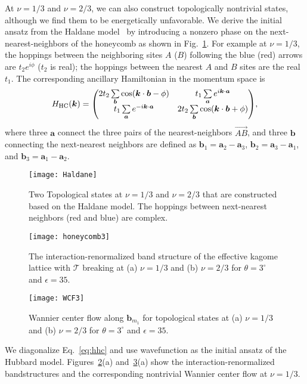\documentclass[aps,prl,floatfix,twocolumn]{revtex4-1}
\begin{document}
At $ \nu=1/3 $ and $ \nu=2/3 $, we can also construct topologically nontrivial states, although we find them to be energetically unfavorable. We derive the initial ansatz from the Haldane model~\cite{haldane1988model,raghu2008topological} by introducing a nonzero phase on the next-nearest-neighbors of the honeycomb as shown in Fig.~\ref{fig:haldane}. For example at $ \nu=1/3 $, the hoppings between the neighboring sites $ A $ ($ B $) following the blue (red) arrows are $ {t_2} e^{i\phi} $ ($ t_2 $ is real); the hoppings between the nearest $ A $ and $ B $ sites are the real $ t_1  $. The corresponding ancillary Hamiltonian in the momentum space is
\begin{equation}\label{eq:hhc}
	H_{\text{HC}}(\bm{k})=\mqty(2t_2 \sum\limits_{\bm{b}} \cos(\bm{k} \cdot \bm{b}-\phi) & t_1 \sum\limits_{\bm{a}} e^{i \bm{k}\cdot \bm{a}}\\
	t_1 \sum\limits_{\bm{a}} e^{-i \bm{k}\cdot \bm{a}}  & 2t_2 \sum\limits_{\bm{b}} \cos(\bm{k}\cdot \bm{b}+\phi)
	),
\end{equation}
where three $ \bm{a} $ connect the three pairs of the nearest-neighbors $ \overrightarrow{AB} $, and three $ \bm{b} $ connecting the next-nearest neighbors are defined as $ \bm{b}_1=\bm{a}_2-\bm{a}_3 $, $ \bm{b}_2=\bm{a}_3-\bm{a}_1 $, and $ \bm{b}_3=\bm{a}_1-\bm{a}_2 $. 
\begin{figure}[t]
	\centering
	\texttt{[image: Haldane]}
	\caption{Two Topological states at $ \nu=1/3 $ and $ \nu=2/3 $ that are constructed based on the Haldane model. The hoppings between next-nearest neighbors (red and blue) are complex.}
	\label{fig:haldane}
\end{figure}


\begin{figure}[t]
	\centering
	\texttt{[image: honeycomb3]}
	\caption{The interaction-renormalized band structure of the effective kagome lattice with $ \mathcal{T} $ breaking at (a) $ \nu=1/3 $ and (b) $ \nu=2/3 $ for $ \theta=3^\circ $ and $ \epsilon=35 $.}
	\label{fig:honeycomb3}
\end{figure}

\begin{figure}[t]
	\centering
	\texttt{[image: WCF3]}
	\caption{Wannier center flow along $ \bm{b}_{m_1} $ for topological states at (a) $ \nu=1/3 $ and (b) $ \nu=2/3 $ for $ \theta=3^\circ $ and $ \epsilon=35 $.}
	\label{fig:WCF3}
\end{figure}
We diagonalize Eq.~\eqref{eq:hhc} and use wavefunction as the initial ansatz of the Hubbard model. Figures~\ref{fig:honeycomb3}(a) and~\ref{fig:WCF3}(a) show the interaction-renormalized bandstructures and the corresponding nontrivial Wannier center flow at $ \nu=1/3 $.
\end{document}
